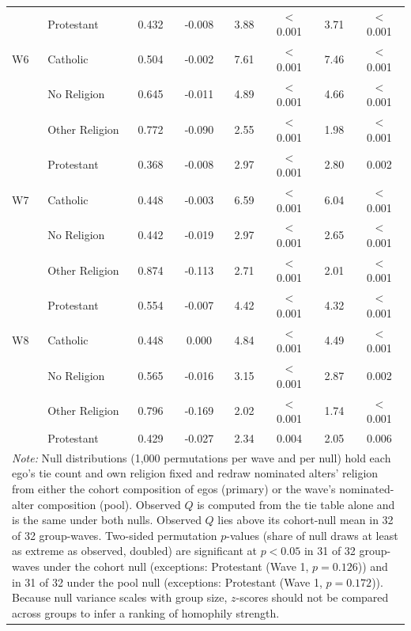 \begin{table}[htbp]
\begin{tabular}{llcccccc}
 & Protestant & 0.432 & -0.008 & 3.88 & $<$0.001 & 3.71 & $<$0.001 \\
\addlinespace
W6 & Catholic & 0.504 & -0.002 & 7.61 & $<$0.001 & 7.46 & $<$0.001 \\
 & No Religion & 0.645 & -0.011 & 4.89 & $<$0.001 & 4.66 & $<$0.001 \\
 & Other Religion & 0.772 & -0.090 & 2.55 & $<$0.001 & 1.98 & $<$0.001 \\
 & Protestant & 0.368 & -0.008 & 2.97 & $<$0.001 & 2.80 & 0.002 \\
\addlinespace
W7 & Catholic & 0.448 & -0.003 & 6.59 & $<$0.001 & 6.04 & $<$0.001 \\
 & No Religion & 0.442 & -0.019 & 2.97 & $<$0.001 & 2.65 & $<$0.001 \\
 & Other Religion & 0.874 & -0.113 & 2.71 & $<$0.001 & 2.01 & $<$0.001 \\
 & Protestant & 0.554 & -0.007 & 4.42 & $<$0.001 & 4.32 & $<$0.001 \\
\addlinespace
W8 & Catholic & 0.448 & 0.000 & 4.84 & $<$0.001 & 4.49 & $<$0.001 \\
 & No Religion & 0.565 & -0.016 & 3.15 & $<$0.001 & 2.87 & 0.002 \\
 & Other Religion & 0.796 & -0.169 & 2.02 & $<$0.001 & 1.74 & $<$0.001 \\
 & Protestant & 0.429 & -0.027 & 2.34 & 0.004 & 2.05 & 0.006 \\
\bottomrule
\multicolumn{8}{p{0.95\textwidth}}{\footnotesize \textit{Note:} Null distributions (1,000 permutations per wave and per null) hold each ego's tie count and own religion fixed and redraw nominated alters' religion from either the cohort composition of egos (primary) or the wave's nominated-alter composition (pool). Observed $Q$ is computed from the tie table alone and is the same under both nulls. Observed $Q$ lies above its cohort-null mean in 32 of 32 group-waves. Two-sided permutation $p$-values (share of null draws at least as extreme as observed, doubled) are significant at $p<0.05$ in 31 of 32 group-waves under the cohort null (exceptions: Protestant (Wave 1, $p = 0.126$)) and in 31 of 32 under the pool null (exceptions: Protestant (Wave 1, $p = 0.172$)). Because null variance scales with group size, $z$-scores should not be compared across groups to infer a ranking of homophily strength.} \\
\end{tabular}
\end{table}
